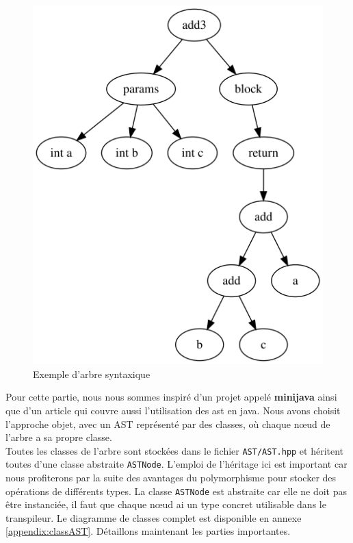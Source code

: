 \documentclass[a4paper]{article}%
\begin{document}
\begin{figure}[h]
  \begin{center}
  \includegraphics[scale=0.4]{img/ast1.png}
  \caption{Exemple d'arbre syntaxique}
  \end{center}
\end{figure}

Pour cette partie, nous nous sommes inspiré d'un projet appelé \textbf{minijava}
\cite{minijava} ainsi que d'un article \cite{gagnon1998sablecc} qui couvre aussi
l'utilisation des \gls{ast} en java. Nous avons choisit l'approche objet, avec un AST
représenté par des classes, où chaque nœud de l'arbre a sa propre classe.\\

Toutes les classes de l'arbre sont stockées dans le fichier
\lstinline{AST/AST.hpp} et héritent toutes d'une classe abstraite
\lstinline{ASTNode}. L'emploi de l'héritage ici est important car
nous profiterons par la suite des avantages du polymorphisme pour stocker des
opérations de différents types. La classe \lstinline{ASTNode} est abstraite car
elle ne doit pas être instanciée, il faut que chaque nœud ai un type concret
utilisable dans le transpileur. Le diagramme de classes complet est disponible
en annexe \ref{appendix:classAST}. Détaillons maintenant les parties
importantes.
\end{document}
